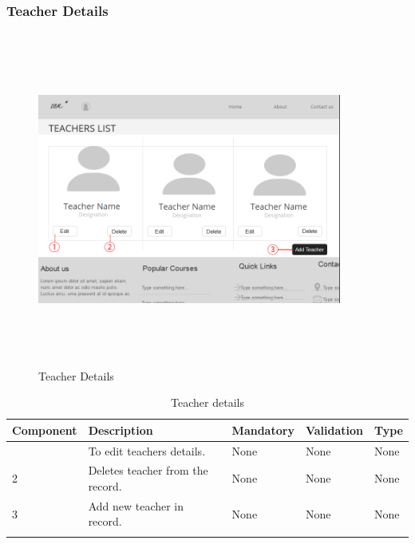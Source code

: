 \documentclass[12pt]{article}
\begin{document}
\subsubsection{Teacher Details}
\begin{figure}[h]
  \centering
  \includegraphics[width=10cm, height=11cm]{TeacherDetails(Admin)}
  \caption{Teacher Details}
\end{figure}
\begin{longtable}{|>{\raggedright\arraybackslash}p{2.5cm}|>{\raggedright\arraybackslash}p{4cm}|>{\raggedright\arraybackslash}p{2.2cm}|>{\raggedright\arraybackslash}p{2cm}|>{\raggedright\arraybackslash}p{2cm}|}
\hline
\textbf{Component} & \textbf{Description} & \textbf{Mandatory} & \textbf{Validation} & \textbf{Type}\\
\hline
1 &
To edit teachers details. &
None &
None &
None \\
\hline

2 &
Deletes teacher from the record. &
None &
None &
None \\
\hline

3 &
Add new teacher in record. &
None &
None &
None \\
\hline

\caption{Teacher details}
\end{longtable}

\newpage

\end{document}

